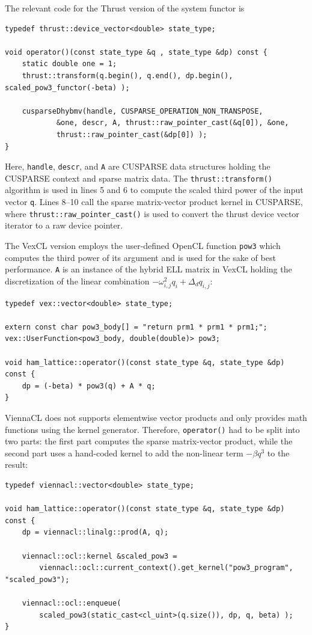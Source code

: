 \documentclass[final]{siamltex}
\newcommand{\code}[1]{\lstinline|#1|}
\begin{document}
The relevant code for the Thrust version of the system functor is
\begin{lstlisting}
typedef thrust::device_vector<double> state_type;

void operator()(const state_type &q , state_type &dp) const {
    static double one = 1;
    thrust::transform(q.begin(), q.end(), dp.begin(), scaled_pow3_functor(-beta) );

    cusparseDhybmv(handle, CUSPARSE_OPERATION_NON_TRANSPOSE,
            &one, descr, A, thrust::raw_pointer_cast(&q[0]), &one,
            thrust::raw_pointer_cast(&dp[0]) );
}
\end{lstlisting}
Here, \code{handle}, \code{descr}, and \code{A} are CUSPARSE data structures
holding the CUSPARSE context and sparse matrix data. The
\code{thrust::transform()} algorithm is used in lines 5 and 6 to compute the scaled 
third power of the input vector \code{q}. Lines 8--10 call the sparse matrix-vector product kernel in CUSPARSE,
where \code{thrust::raw_pointer_cast()} is used to convert the thrust device
vector iterator to a raw device pointer.

The VexCL version employs the user-defined OpenCL function \code{pow3} which
computes the third power of its argument and is used for the sake of best performance.
\code{A} is an instance of the hybrid ELL matrix in VexCL
holding the discretization of the linear combination $- \omega_{i,j}^2 q_i + \Delta_d q_{i,j}$:
\begin{lstlisting}
typedef vex::vector<double> state_type;

extern const char pow3_body[] = "return prm1 * prm1 * prm1;";
vex::UserFunction<pow3_body, double(double)> pow3;

void ham_lattice::operator()(const state_type &q, state_type &dp) const {
    dp = (-beta) * pow3(q) + A * q;
}
\end{lstlisting}

ViennaCL does not supports elementwise vector products and only provides
math functions using the kernel generator. Therefore, 
\code{operator()} had to be split into two parts: the first part computes 
the sparse matrix-vector product, while the second part uses a hand-coded kernel to
add the non-linear term $-\beta q^3$ to the result:
\begin{lstlisting}
typedef viennacl::vector<double> state_type;

void ham_lattice::operator()(const state_type &q, state_type &dp) const {
    dp = viennacl::linalg::prod(A, q);

    viennacl::ocl::kernel &scaled_pow3 =
        viennacl::ocl::current_context().get_kernel("pow3_program", "scaled_pow3");

    viennacl::ocl::enqueue(
        scaled_pow3(static_cast<cl_uint>(q.size()), dp, q, beta) );
}
\end{lstlisting}
\end{document}
